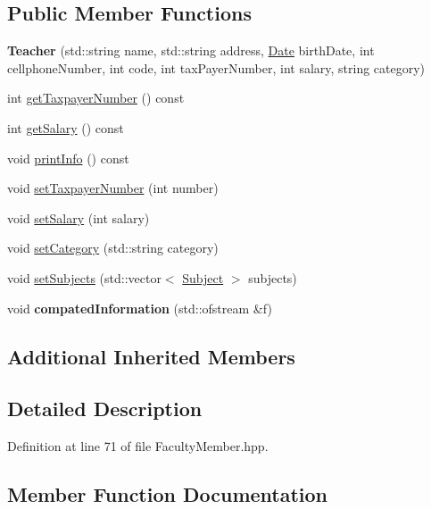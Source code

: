 \subsection*{Public Member Functions}
\begin{DoxyCompactItemize}
\item 
\mbox{\label{classTeacher_a844ddfba3aa130fddb487a862b5b7dab}} 
{\bfseries Teacher} (std\+::string name, std\+::string address, \hyperlink{classDate}{Date} birth\+Date, int cellphone\+Number, int code, int tax\+Payer\+Number, int salary, string category)
\item 
int \hyperlink{classTeacher_a3799bff1314b56a805273da1166304a3}{get\+Taxpayer\+Number} () const
\item 
int \hyperlink{classTeacher_abd551fc16a882af2eaaaade03dfc4dc9}{get\+Salary} () const
\item 
void \hyperlink{classTeacher_ae1fc6d174a25c714bfb73abf4620de03}{print\+Info} () const
\item 
void \hyperlink{classTeacher_a76e9731a32474291c679de1b7c8ddad5}{set\+Taxpayer\+Number} (int number)
\item 
void \hyperlink{classTeacher_a3d87b4630b21c0d7a8aa4651593a0937}{set\+Salary} (int salary)
\item 
void \hyperlink{classTeacher_ab713b38d67cafbe0d1c51eb73921e1a7}{set\+Category} (std\+::string category)
\item 
void \hyperlink{classTeacher_aac2aba678e32ce5a5f57989b55dc0952}{set\+Subjects} (std\+::vector$<$ \hyperlink{classSubject}{Subject} $>$ subjects)
\item 
\mbox{\label{classTeacher_a3fa54467f61048678701e6673e5e1c96}} 
void {\bfseries compated\+Information} (std\+::ofstream \&f)
\end{DoxyCompactItemize}
\subsection*{Additional Inherited Members}


\subsection{Detailed Description}


Definition at line 71 of file Faculty\+Member.\+hpp.



\subsection{Member Function Documentation}
\mbox{\label{classTeacher_abd551fc16a882af2eaaaade03dfc4dc9}} 

